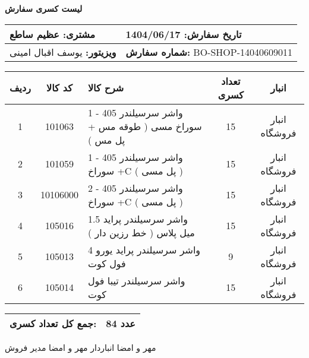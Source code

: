 \documentclass[a4paper,12pt]{article}
\begin{document}
\begin{center}
    {\Huge \textbf{   لیست کسری سفارش   }} \\
\end{center}

\vspace{0.5cm}

\noindent
\begin{tabular}{|p{7cm}|p{7cm}|}
\hline
\textbf{مشتری:} عظیم ساطع & \textbf{تاریخ سفارش:} 1404/06/17 \\
\hline
\textbf{ویزیتور:} یوسف اقبال امینی & \textbf{شماره سفارش:} BO-SHOP-14040609011 \\
\hline
\end{tabular}

\vspace{0.5cm}

\begin{longtable}{|c|c|p{6cm}|c|c|}
\hline
\rowcolor{headerblue} \color{white}
\textbf{ردیف} &  \textbf{کد کالا} & \textbf{شرح کالا} & \textbf{تعداد کسری} & \textbf{انبار} \\
\hline
\endhead
1 & 101063 & واشر سرسیلندر 405 - 1 سوراخ مسی ( طوقه مس + پل مس ) & 15 & انبار فروشگاه \\
\hline
2 & 101059 & واشر سرسیلندر 405 - 1 سوراخ +C ( پل مسی ) & 15 & انبار فروشگاه \\
\hline
3 & 10106000 & واشر سرسیلندر 405 - 2 سوراخ +C ( پل مسی ) & 15 & انبار فروشگاه \\
\hline
4 & 105016 & واشر سرسیلندر پراید 1.5 میل پلاس ( خط رزین دار ) & 15 & انبار فروشگاه \\
\hline
5 & 105013 & واشر سرسیلندر پراید یورو 4 فول کوت & 9 & انبار فروشگاه \\
\hline
6 & 105014 & واشر سرسیلندر تیبا فول کوت & 15 & انبار فروشگاه \\
\hline

\end{longtable}

\vspace{0.3cm}
\noindent
\begin{tabular}{|p{7cm}|p{7cm}|}
\hline
\textbf{جمع کل تعداد کسری:} & 84 عدد \\
\hline
\end{tabular}

\vspace{1.5cm}

\noindent
مهر و امضا انباردار \hspace{8cm} مهر و امضا مدیر فروش
\end{document}
